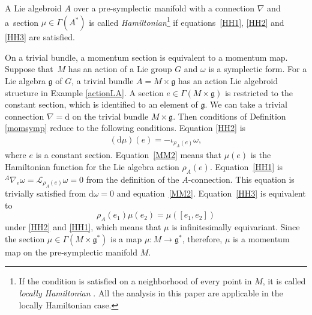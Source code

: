 \documentclass[10pt,a4paper]{amsart}
\numberwithin{equation}{section}
\newcommand{\calL}{{\mathcal L}}
\newcommand{\rhoa}{{\rho_A}}
\newcommand{\rd}{\mathrm{d}}
\newcommand{\anabla}{{{}^A \nabla}}
\begin{document}
\begin{Definition}\label{HamiltonianLAS}
A Lie algebroid $A$ over a pre-symplectic manifold with a connection $\nabla$ and a~section $\mu \in \Gamma(A^*)$ is called \textit{Hamiltonian}\footnote{If the condition is satisfied on a neighborhood of every point in $M$, it is called \textit{locally Hamiltonian} \cite{Blohmann:2018}. All the analysis in this paper are applicable in the locally Hamiltonian case.}
if equations~\eqref{HH1}, \eqref{HH2} and \eqref{HH3}
are satisfied.
\end{Definition}
On a trivial bundle, a momentum section is equivalent to a momentum map.
Suppose that~$M$ has an action of a Lie group $G$
and $\omega$ is a symplectic form.
For a Lie algebra $\mathfrak{g}$ of $G$, a trivial bundle
$A = M \times \mathfrak{g}$ has an action Lie algebroid structure
in Example \ref{actionLA}.
A section $e \in \Gamma(M \times \mathfrak{g})$ is
restricted to the constant section, which is identified
to an element of $\mathfrak{g}$.
We can take a trivial connection $\nabla=\rd$ on the trivial bundle
$M \times \mathfrak{g}$.
Then conditions of Definition \ref{momsymp} reduce
to the following conditions.
Equation \eqref{HH2} is
\begin{gather}
(\rd \mu)(e) = - \iota_{\rhoa(e)} \omega,
\label{MM2}
\end{gather}
where $e$ is a constant section.
Equation~\eqref{MM2} means that $\mu(e)$ is the Hamiltonian function for the Lie algebra action $\rhoa(e)$.
Equation~\eqref{HH1} is
$\anabla_e \omega = \calL_{\rhoa(e)} \omega = 0$ from the definition of
the $A$-connection.
This equation is trivially satisfied from $\rd \omega =0$ and equation~\eqref{MM2}.
Equation~\eqref{HH3} is equivalent to
\[%
\rhoa(e_1) \mu(e_2) = \mu([e_1, e_2])
\]
under \eqref{HH2} and \eqref{HH1}, which means that $\mu$ is infinitesimally
equivariant.
Since the section $\mu \in \Gamma(M \times \mathfrak{g}^*)$ is a map
$\mu\colon M \rightarrow \mathfrak{g}^*$,
therefore, $\mu$ is a momentum map on the pre-symplectic manifold $M$.
\end{document}
